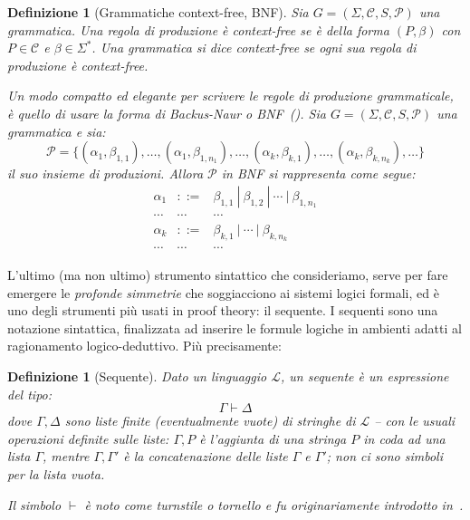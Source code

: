 \documentclass[12pt,a4paper,openright,twoside]{report}
\newtheorem{dfn}[thm]{Definizione}
\begin{document}
\begin{dfn}[Grammatiche context-free, BNF]
Sia $G = (\Sigma, \mathcal{C}, S, \mathcal{P})$ una grammatica. Una \emph{regola di produzione} \`e \emph{context-free} se \`e della forma $(P, \beta)$ con $P \in \mathcal{C}$ e $\beta \in \Sigma^*$. Una \emph{grammatica} si dice \emph{context-free} se ogni sua regola di produzione \`e context-free.

Un modo compatto ed elegante per scrivere le regole di produzione grammaticale, \`e quello di usare la \emph{forma di Backus-Naur} o \mbox{BNF}~(\cite{Bac60}). Sia $G = (\Sigma, \mathcal{C}, S, \mathcal{P})$ una grammatica e sia:
$$
	\mathcal{P} = \{ (\alpha_1, \beta_{1,1}), \ldots, (\alpha_1, \beta_{1,n_1}), \ldots, (\alpha_k, \beta_{k,1}), \ldots, (\alpha_k, \beta_{k,n_k}), \ldots \}
$$
il suo insieme di produzioni. Allora $\mathcal{P}$ in BNF si rappresenta come segue:
\begin{eqnarray*}
	\alpha_1 & ::= & \beta_{1,1} \:|\: \beta_{1,2} \:|\: \cdots \:|\: \beta_{1,n_1} \\
	\cdots & \cdots & \cdots \\
	\alpha_k & ::= & \beta_{k,1} \:|\: \cdots \:|\: \beta_{k,n_k} \\
	\cdots & \cdots & \cdots 
\end{eqnarray*}
\end{dfn}


L'ultimo (ma non ultimo) strumento sintattico che consideriamo, serve per fare emergere le \emph{profonde simmetrie} che soggiacciono ai sistemi logici formali, ed \`e uno degli strumenti pi\`u usati in proof theory: il sequente. I sequenti sono una notazione sintattica, finalizzata ad inserire le formule logiche in ambienti adatti al ragionamento logico-deduttivo. Pi\`u precisamente:

\begin{dfn}[Sequente]\label{def:seq}
Dato un linguaggio $\mathscr{L}$, un \emph{sequente} \`e un espressione del tipo:
$$
	\Gamma \vdash \Delta
$$
dove $\Gamma, \Delta$ sono \emph{liste finite} (eventualmente vuote) di stringhe di $\mathscr{L}$ -- con le usuali operazioni definite sulle liste: $\Gamma, P$ \`e l'aggiunta di una stringa $P$ in coda ad una lista $\Gamma$, mentre $\Gamma, \Gamma'$ \`e la concatenazione delle liste $\Gamma$ e $\Gamma'$; non ci sono simboli per la lista vuota.

Il simbolo $\vdash$ \`e noto come \emph{turnstile} o \emph{tornello} e fu originariamente introdotto in~\cite{Fre79}.
\end{dfn}
\end{document}

